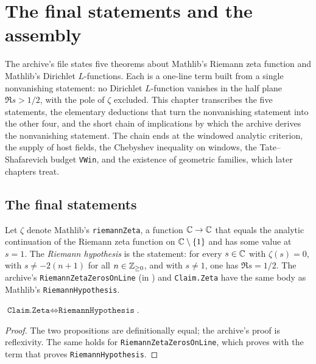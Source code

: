 \chapter{The final statements and the assembly}\label{ch:fin}

The archive's file  states five theorems about Mathlib's
Riemann zeta function and Mathlib's Dirichlet $L$-functions. Each is a one-line
term built from a single nonvanishing statement: no Dirichlet $L$-function
vanishes in the half plane $\Re s>1/2$, with the pole of $\zeta$ excluded. This
chapter transcribes the five statements, the elementary deductions that turn the
nonvanishing statement into the other four, and the short chain of implications
by which the archive derives the nonvanishing statement. The chain ends at the
windowed analytic criterion, the supply of host fields, the Chebyshev inequality
on windows, the Tate--Shafarevich budget \texttt{VWin}, and the existence of
geometric families, which later chapters treat.

\section{The final statements}

\begin{definition}\label{fin:rh-def}
Let $\zeta$ denote Mathlib's \texttt{riemannZeta}, a function
$\mathbb{C}\to\mathbb{C}$ that equals the analytic continuation of the Riemann zeta function
on $\mathbb{C}\setminus\{1\}$ and has some value at $s=1$. The \emph{Riemann
hypothesis} is the statement: for every $s\in\mathbb{C}$ with $\zeta(s)=0$, with
$s\ne -2(n+1)$ for all $n\in\mathbb{Z}_{\ge0}$, and with $s\ne1$, one has $\Re s=1/2$.
The archive's \texttt{RiemannZetaZerosOnLine} (in ) and
\texttt{Claim.Zeta} have the same body as Mathlib's \texttt{RiemannHypothesis}.
\end{definition}

\begin{lemma}\label{fin:zeta-iff}
$\texttt{Claim.Zeta}\iff\texttt{RiemannHypothesis}$.
\end{lemma}
\begin{proof}
The two propositions are definitionally equal; the archive's proof is
reflexivity. The same holds for \texttt{RiemannZetaZerosOnLine}, which
 proves with the term that proves \texttt{RiemannHypothesis}.
\end{proof}

